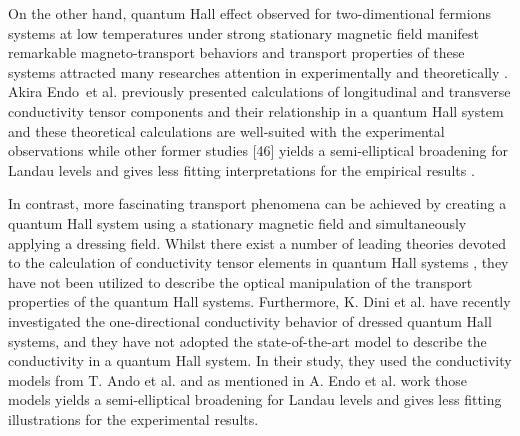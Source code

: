 On the other hand, quantum Hall effect \cite{girvin90} observed for two-dimentional fermions systems at low temperatures under strong stationary magnetic field manifest remarkable magneto-transport behaviors and transport properties of these systems attracted many researches attention in experimentally \cite{allerman95,tieke97,pan05} and theoretically \cite{ando72,ando74_1,ando74_2,ando74_3,ando74_4,ando82,endo09}.
Akira Endo et al. \cite{endo09} previously presented calculations of longitudinal and transverse conductivity tensor components and their relationship in a quantum Hall system and these theoretical calculations are well-suited with the experimental observations while other former studies [46] yields a semi-elliptical broadening for Landau levels and gives less fitting interpretations for the empirical results \cite{endo09}.

In contrast, more fascinating transport phenomena can be achieved by creating a quantum Hall system using a stationary magnetic field and simultaneously applying a dressing field.
Whilst there exist a number of leading theories devoted to the calculation of conductivity tensor elements in quantum Hall systems \cite{ando74_1,ando82,endo09}, they have not been utilized to describe the optical manipulation of the transport properties of the quantum Hall systems.
Furthermore, K. Dini et al. \cite{dini16} have recently investigated the one-directional conductivity behavior of dressed quantum Hall systems, and they have not adopted the state-of-the-art model to describe the conductivity in a quantum Hall system. In their study, they used the conductivity models from T. Ando et al. \cite{ando74_1,ando82} and as mentioned in A. Endo et al. work \cite{endo09} those models yields a semi-elliptical broadening for Landau levels and gives less fitting illustrations for the experimental results.

